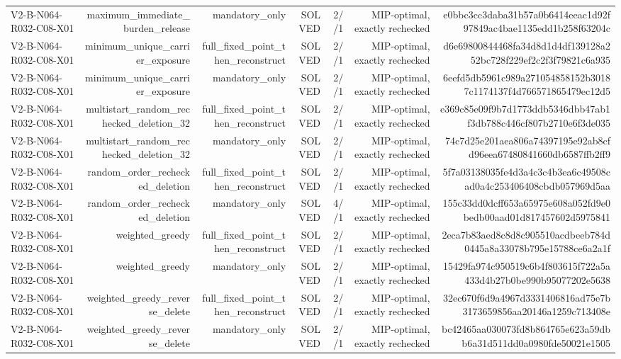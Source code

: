 {\begin{longtable}{lrrrrrr}
V2-B-N064-R032-C08-X01 & maximum\_immediate\_burden\_release & mandatory\_only & SOLVED & 2//1 & MIP-optimal, exactly rechecked & e0bbc3cc3daba31b57a0b6414eeac1d92f97849ac4bae1135edd1b258f63204c \\
V2-B-N064-R032-C08-X01 & minimum\_unique\_carrier\_exposure & full\_fixed\_point\_then\_reconstruct & SOLVED & 2//1 & MIP-optimal, exactly rechecked & d6e69800844468fa34d8d1d4df139128a252bc728f229ef2c2f3f79821c6a935 \\
V2-B-N064-R032-C08-X01 & minimum\_unique\_carrier\_exposure & mandatory\_only & SOLVED & 2//1 & MIP-optimal, exactly rechecked & 6eefd5db5961c989a271054858152b30187c1174137f4d766571865479ec12d5 \\
V2-B-N064-R032-C08-X01 & multistart\_random\_rechecked\_deletion\_32 & full\_fixed\_point\_then\_reconstruct & SOLVED & 2//1 & MIP-optimal, exactly rechecked & e369c85e09f9b7d1773ddb5346dbb47ab1f3db788c446cf807b2710e6f3de035 \\
V2-B-N064-R032-C08-X01 & multistart\_random\_rechecked\_deletion\_32 & mandatory\_only & SOLVED & 2//1 & MIP-optimal, exactly rechecked & 74c7d25e201aea806a74397195e92ab8cfd96eea67480841660db6587ffb2ff9 \\
V2-B-N064-R032-C08-X01 & random\_order\_rechecked\_deletion & full\_fixed\_point\_then\_reconstruct & SOLVED & 2//1 & MIP-optimal, exactly rechecked & 5f7a03138035fe4d3a4c3c4b3ea6c49508cad0a4c253406408cbdb057969d5aa \\
V2-B-N064-R032-C08-X01 & random\_order\_rechecked\_deletion & mandatory\_only & SOLVED & 4//1 & MIP-optimal, exactly rechecked & 155c33dd0dcff653a65975e608a052fd9e0bedb00aad01d817457602d5975841 \\
V2-B-N064-R032-C08-X01 & weighted\_greedy & full\_fixed\_point\_then\_reconstruct & SOLVED & 2//1 & MIP-optimal, exactly rechecked & 2eca7b83aed8c8d8c905510acdbeeb784d0445a8a33078b795e15788ce6a2a1f \\
V2-B-N064-R032-C08-X01 & weighted\_greedy & mandatory\_only & SOLVED & 2//1 & MIP-optimal, exactly rechecked & 15429fa974c950519c6b4f803615f722a5a433d4b27b0be990b95077202e5638 \\
V2-B-N064-R032-C08-X01 & weighted\_greedy\_reverse\_delete & full\_fixed\_point\_then\_reconstruct & SOLVED & 2//1 & MIP-optimal, exactly rechecked & 32ec670f6d9a4967d3331406816ad75e7b3173659856aa20146a1259c713408e \\
V2-B-N064-R032-C08-X01 & weighted\_greedy\_reverse\_delete & mandatory\_only & SOLVED & 2//1 & MIP-optimal, exactly rechecked & bc42465aa030073fd8b864765e623a59dbb6a31d511dd0a0980fde50021e1505 \\

\end{longtable}}
